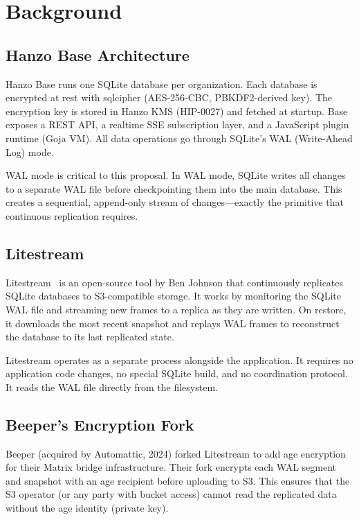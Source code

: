 \section{Background}


\subsection{Hanzo Base Architecture}

Hanzo Base runs one SQLite database per organization. Each database is
encrypted at rest with sqlcipher (AES-256-CBC, PBKDF2-derived key). The
encryption key is stored in Hanzo KMS (HIP-0027) and fetched at startup.
Base exposes a REST API, a realtime SSE subscription layer, and a JavaScript
plugin runtime (Goja VM). All data operations go through SQLite's WAL
(Write-Ahead Log) mode.

WAL mode is critical to this proposal. In WAL mode, SQLite writes all
changes to a separate WAL file before checkpointing them into the main
database. This creates a sequential, append-only stream of changes---exactly
the primitive that continuous replication requires.

\subsection{Litestream}

Litestream~\cite{litestream} is an open-source tool by Ben Johnson that
continuously replicates SQLite databases to S3-compatible storage. It works
by monitoring the SQLite WAL file and streaming new frames to a replica as
they are written. On restore, it downloads the most recent snapshot and
replays WAL frames to reconstruct the database to its last replicated state.

Litestream operates as a separate process alongside the application. It
requires no application code changes, no special SQLite build, and no
coordination protocol. It reads the WAL file directly from the filesystem.

\subsection{Beeper's Encryption Fork}

Beeper (acquired by Automattic, 2024) forked Litestream to add age
encryption for their Matrix bridge infrastructure. Their fork encrypts each
WAL segment and snapshot with an age recipient before uploading to S3. This
ensures that the S3 operator (or any party with bucket access) cannot read
the replicated data without the age identity (private key).

